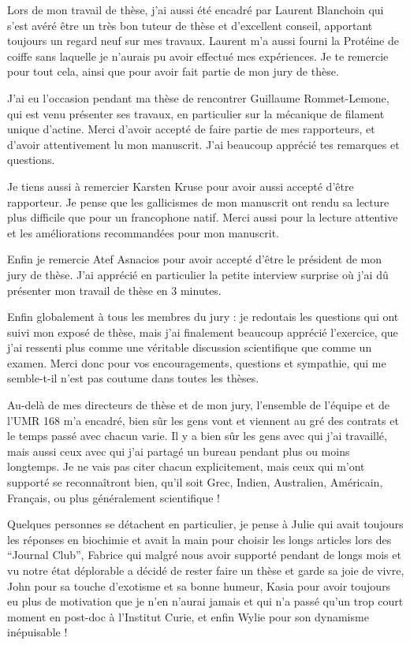 \documentclass[A4paperpaper,11pt,english]{sphinxmanual}
\begin{document}
Lors de mon travail de thèse, j'ai aussi été encadré par Laurent Blanchoin
qui s'est avéré être un très bon tuteur de thèse et d'excellent conseil,
apportant toujours un regard neuf sur mes travaux. Laurent m'a aussi fourni la
Protéine de coiffe sans laquelle je n'aurais pu avoir effectué mes
expériences. Je te remercie pour tout cela, ainsi que pour avoir fait partie de
mon jury de thèse.

J'ai eu l'occasion pendant ma thèse de rencontrer Guillaume Rommet-Lemone, qui
est venu présenter ses travaux, en particulier sur la mécanique de filament
unique d'actine. Merci d'avoir accepté de faire partie de mes rapporteurs, et
d'avoir attentivement lu mon manuscrit. J'ai beaucoup apprécié tes remarques
et questions.

Je tiens aussi à remercier Karsten Kruse pour avoir aussi accepté d'être
rapporteur. Je pense que les gallicismes de mon manuscrit ont rendu sa lecture
plus difficile que pour un francophone natif. Merci aussi pour la lecture attentive
et les améliorations recommandées pour mon manuscrit.

Enfin je remercie Atef Asnacios pour avoir accepté d'être le président de mon
jury de thèse. J'ai apprécié en particulier la petite interview surprise où
j'ai dû présenter mon travail de thèse en 3 minutes.

Enfin globalement à tous les membres du jury : je redoutais les questions qui
ont suivi mon exposé de thèse, mais j'ai finalement beaucoup apprécié
l'exercice, que j'ai ressenti plus comme une véritable discussion scientifique
que comme un examen. Merci donc pour vos encouragements, questions et sympathie,
qui me semble-t-il n'est pas coutume dans toutes les thèses.

Au-delà de mes directeurs de thèse et de mon jury, l'ensemble de l'équipe et de
l'UMR 168 m'a encadré, bien sûr les gens vont et viennent au gré des contrats et
le temps passé avec chacun varie. Il y a bien sûr les gens avec qui j'ai
travaillé, mais aussi ceux avec qui j'ai partagé un bureau pendant plus ou
moins longtemps. Je ne vais pas citer chacun explicitement, mais ceux qui m'ont
supporté se reconnaîtront bien, qu'il soit Grec, Indien, Australien,
Américain, Français, ou plus généralement scientifique !

Quelques personnes se détachent en particulier, je pense à Julie qui avait
toujours les réponses en biochimie et avait la main pour choisir les longs
articles lors des ``Journal Club'', Fabrice qui malgré nous avoir supporté
pendant de longs mois et vu notre état déplorable a décidé de rester faire un
thèse et garde sa joie de vivre, John pour sa touche d'exotisme et sa bonne
humeur, Kasia pour avoir toujours eu plus de motivation que je n'en n'aurai
jamais et qui n'a passé qu'un trop court moment en post-doc à l'Institut Curie,
et enfin Wylie pour son dynamisme inépuisable !
\end{document}
